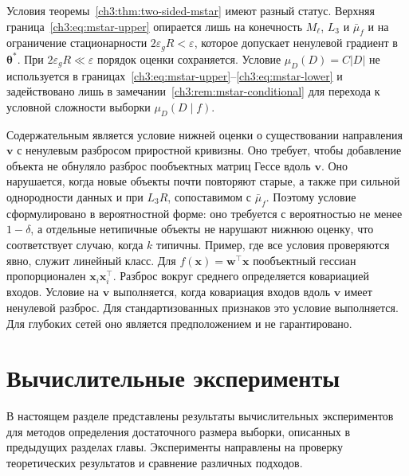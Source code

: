 \begin{remark}\label{ch3:rem:mstar-scope}
Условия теоремы~\ref{ch3:thm:two-sided-mstar} имеют разный статус.
Верхняя граница~\eqref{ch3:eq:mstar-upper} опирается лишь на конечность $M_\ell$, $L_3$ и $\bar\mu_f$ и на ограничение стационарности $2\varepsilon_gR<\varepsilon$, которое допускает ненулевой градиент в~$\boldsymbol{\theta}^*$.
При $2\varepsilon_gR\ll\varepsilon$ порядок оценки сохраняется.
Условие $\mu_D(D)=C\lvert D\rvert$ не используется в границах~\eqref{ch3:eq:mstar-upper}--\eqref{ch3:eq:mstar-lower} и задействовано лишь в замечании~\ref{ch3:rem:mstar-conditional} для перехода к условной сложности выборки $\mu_D(D\mid f)$.

Содержательным является условие нижней оценки о существовании направления $\mathbf{v}$ с ненулевым разбросом приростной кривизны.
Оно требует, чтобы добавление объекта не обнуляло разброс пообъектных матриц Гессе вдоль $\mathbf{v}$.
Оно нарушается, когда новые объекты почти повторяют старые, а также при сильной однородности данных и при $L_3R$, сопоставимом с $\bar\mu_f$.
Поэтому условие сформулировано в вероятностной форме: оно требуется с вероятностью не менее $1-\delta$, а отдельные нетипичные объекты не нарушают нижнюю оценку, что соответствует случаю, когда $k$ типичны.
Пример, где все условия проверяются явно, служит линейный класс.
Для $f(\mathbf{x})=\mathbf{w}^{\top}\mathbf{x}$ пообъектный гессиан пропорционален $\mathbf{x}_i\mathbf{x}_i^{\top}$.
Разброс вокруг среднего определяется ковариацией входов.
Условие на $\mathbf{v}$ выполняется, когда ковариация входов вдоль $\mathbf{v}$ имеет ненулевой разброс.
Для стандартизованных признаков это условие выполняется.
Для глубоких сетей оно является предположением и не гарантировано.
\end{remark}

\section{Вычислительные эксперименты}

В настоящем разделе представлены результаты вычислительных экспериментов для методов определения достаточного размера выборки, описанных в предыдущих разделах главы. Эксперименты направлены на проверку теоретических результатов и сравнение различных подходов.

